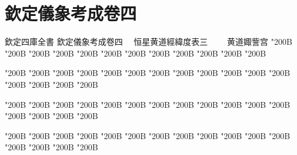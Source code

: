 \chapter*{欽定儀象考成卷四}
\begin{正文}
欽定四庫全書
欽定儀象考成卷四
　恒星黄道經緯度表三
　　黄道娵訾宫
\char"200B\relax{}
\char"200B\relax{}
\char"200B\relax{}
\char"200B\relax{}
\char"200B\relax{}
\char"200B\relax{}
\char"200B\relax{}
\char"200B\relax{}
\char"200B\relax{}
\char"200B\relax{}
\char"200B\relax{}
\char"200B\relax
\par
\end{正文}\clearpage
{}
\begin{正文}
\char"200B\relax{}
\char"200B\relax{}
\char"200B\relax{}
\char"200B\relax{}
\char"200B\relax{}
\char"200B\relax{}
\char"200B\relax{}
\char"200B\relax{}
\char"200B\relax{}
\char"200B\relax{}
\char"200B\relax{}
\char"200B\relax{}
\char"200B\relax{}
\char"200B\relax{}
\char"200B\relax{}
\char"200B\relax
{}\par
\end{正文}\clearpage
{}
\begin{正文}
\char"200B\relax{}
\char"200B\relax{}
\char"200B\relax{}
\char"200B\relax{}
\char"200B\relax{}
\char"200B\relax{}
\char"200B\relax{}
\char"200B\relax{}
\char"200B\relax{}
\char"200B\relax{}
\char"200B\relax{}
\char"200B\relax{}
\char"200B\relax{}
\char"200B\relax{}
\char"200B\relax{}
\char"200B\relax
{}\par
\end{正文}\clearpage
{}
\begin{正文}
\char"200B\relax{}
\char"200B\relax{}
\char"200B\relax{}
\char"200B\relax{}
\char"200B\relax{}
\char"200B\relax{}
\char"200B\relax{}
\char"200B\relax{}
\char"200B\relax{}
\char"200B\relax{}
\char"200B\relax{}
\char"200B\relax{}
\char"200B\relax{}
\char"200B\relax{}
\char"200B\relax{}
\char"200B\relax
{}\par
\end{正文}\clearpage
